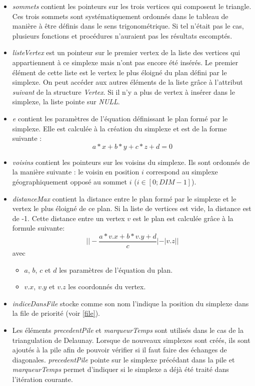 \documentclass{article}
\begin{document}
    \begin{itemize}
    \item \textit{sommets} contient les pointeurs sur les trois vertices qui composent le triangle. Ces trois sommets sont systématiquement ordonnés dans le tableau de manière à être définis dans le sens trigonométrique. Si tel n'était pas le cas, plusieurs fonctions et procédures n'auraient pas les résultats escomptés.
    \item \textit{listeVertex} est un pointeur sur le premier vertex de la liste des vertices qui appartiennent à ce simplexe mais n'ont pas encore été insérés. Le premier élément de cette liste est le vertex le plus éloigné du plan défini par le simplexe. On peut accéder aux autres éléments de la liste grâce à l'attribut \textit{suivant} de la structure \textit{Vertex}. Si il n'y a plus de vertex à insérer dans le simplexe, la liste pointe sur \textit{NULL}.
    \item \textit{e} contient les paramètres de l'équation définissant le plan formé par le simplexe. Elle est calculée à la création du simplexe et est de la forme suivante : \[a*x + b*y +c*z + d = 0\]
    \item \textit{voisins} contient les pointeurs sur les voisins du simplexe. Ils sont ordonnés de la manière suivante : le voisin en position $i$ correspond au simplexe géographiquement opposé au sommet $i$ ($i \in [0; \textit{DIM}-1]$).
    \item \textit{distanceMax} contient la distance entre le plan formé par le simplexe et le vertex le plus éloigné de ce plan. Si la liste de vertices est vide, la distance est de -1. Cette distance entre un vertex $v$ est le plan est calculée grâce à la formule suivante: \[| |-\frac{a * v.x + b*v.y + d}{c}| - |v.z| | \] avec 
    \begin{itemize}
    \item $a$, $b$, $c$ et $d$ les paramètres de l'équation du plan.
    \item $v.x$, $v.y$ et $v.z$ les coordonnés du vertex.
    \end{itemize}
    \item \textit{indiceDansFile} stocke comme son nom l'indique la position du simplexe dans la file de priorité (voir \ref{file}).
    \item Les éléments \textit{precedentPile} et \textit{marqueurTemps} sont utilisés dans le cas de la triangulation de Delaunay. Lorsque de nouveaux simplexes sont créés, ils sont ajoutés à la pile afin de pouvoir vérifier si il faut faire des échanges de diagonales. \textit{precedentPile} pointe sur le simplexe précédant dans la pile et \textit{marqueurTemps} permet d'indiquer si le simplexe a déjà été traité dans l'itération courante.
    \end{itemize}
\end{document}
